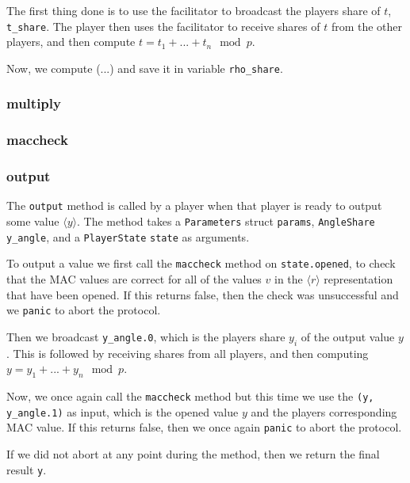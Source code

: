 \documentclass[../main.tex]{subfiles}
\begin{document}
The first thing done is to use the facilitator to broadcast the players share of $t$, \lstinline{t_share}. The player then uses the facilitator to receive shares of $t$ from the other players, and then compute $t = t_1 + ... + t_n \mod p$.

Now, we compute (...) and save it in variable \lstinline{rho_share}.

\subsubsection{multiply}
\subsubsection{maccheck}
\subsubsection{output}
The \lstinline{output} method is called by a player when that player is ready to output some value $\langle y \rangle$. The method takes a \lstinline{Parameters} struct \lstinline{params}, \lstinline{AngleShare} \lstinline{y_angle}, and a \lstinline{PlayerState} \lstinline{state} as arguments.

To output a value we first call the \lstinline{maccheck} method on \lstinline{state.opened}, to check that the MAC values are correct for all of the values $v$ in the $\langle r \rangle$ representation that have been opened. If this returns false, then the check was unsuccessful and we \lstinline{panic} to abort the protocol.

Then we broadcast \lstinline{y_angle.0}, which is the players share $y_i$ of the output value $y$. This is followed by receiving shares from all players, and then computing $y = y_1 + ... + y_n \mod p$.

Now, we once again call the \lstinline{maccheck} method but this time we use the \lstinline{(y, y_angle.1)} as input, which is the opened value $y$ and the players corresponding MAC value. If this returns false, then we once again \lstinline{panic} to abort the protocol.

If we did not abort at any point during the method, then we return the final result \lstinline{y}.
\end{document}
